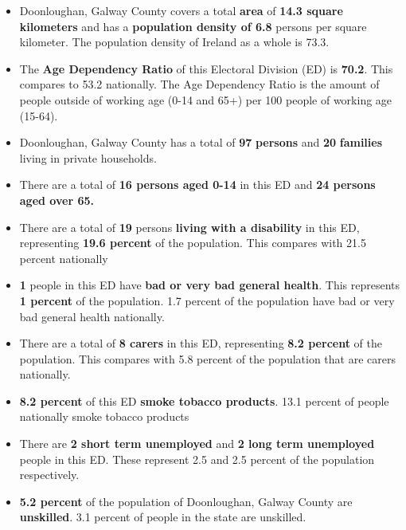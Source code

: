 \documentclass{article}
\begin{document}
\begin{itemize}

\item Doonloughan, Galway County covers a total \textbf{area} of  \textbf{14.3 square kilometers} and has a \textbf{population density of 6.8} persons per square kilometer. The population density of Ireland as a whole is  73.3. 

\item The \textbf{Age Dependency Ratio} of this Electoral Division (ED) is  \textbf{70.2}. This compares to 53.2 nationally. The Age Dependency Ratio is the amount of people outside of working age (0-14 and 65+) per 100 people of working age (15-64). 

\item Doonloughan, Galway County has a total of \textbf{97} \textbf{persons} and  \textbf{20} \textbf{families} living in private households.

\item There are a total of \textbf{16 persons aged 0-14} in this ED and \textbf{24 persons aged over 65.} 

\item There are a total of \textbf{19} persons \textbf{living with a disability} in this ED, representing \textbf{19.6 percent} of the population. This compares with  21.5 percent nationally

\item \textbf{1} people in this ED have \textbf{bad or very bad general health}. This represents \textbf{1 percent} of the population. 1.7 percent of the population have bad or very bad general health nationally. 

\item There are a total of \textbf{8 carers} in this ED, representing \textbf{8.2 percent} of the population. This compares with 5.8 percent of the population that are carers nationally. 

\item \textbf{8.2 percent} of this ED \textbf{smoke tobacco products}. 13.1 percent of people nationally smoke tobacco products

\item There are \textbf{2 short term unemployed} and \textbf{2 long term unemployed} people in this ED. These represent 2.5 and 2.5 percent of the population respectively.

\item  \textbf{5.2 percent} of the population of Doonloughan, Galway County are \textbf{unskilled}. 3.1 percent of people in the state are unskilled.


\end{itemize}
\end{document}
